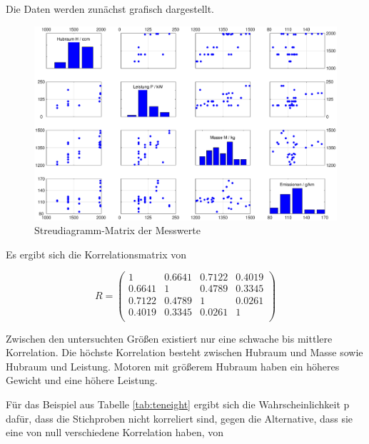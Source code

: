 \clearpage

\noindent Die Daten werden zun\"{a}chst grafisch dargestellt. 

\noindent 
\begin{figure}[H]
  \centerline{\includegraphics[width=1\textwidth]{Kapitel10/Bilder/image5}}
  \caption{Streudiagramm-Matrix der Messwerte}
  \label{fig:Fahrzeugemissionen}
\end{figure}

\noindent Es ergibt sich die Korrelationsmatrix von 

\begin{equation}\label{eq:tenseventythree}
R=
\begin{pmatrix}
1 & 0.6641 & 0.7122 & 0.4019\\
0.6641 & 1 & 0.4789 & 0.3345\\
0.7122 & 0.4789 & 1 & 0.0261\\
0.4019 & 0.3345 & 0.0261 & 1\\
\end{pmatrix}
\end{equation}

\noindent Zwischen den untersuchten Gr\"{o}{\ss}en existiert nur eine schwache bis mittlere Korrelation. Die h\"{o}chste Korrelation besteht zwischen Hubraum und Masse sowie Hubraum und Leistung. Motoren mit gr\"{o}{\ss}erem Hubraum haben ein h\"{o}heres Gewicht und eine h\"{o}here Leistung. \newline

\noindent F\"{u}r das Beispiel aus Tabelle \ref{tab:teneight} ergibt sich die Wahrscheinlichkeit p daf\"{u}r, dass die Stichproben nicht korreliert sind, gegen die Alternative, dass sie eine von null verschiedene Korrelation haben, von

